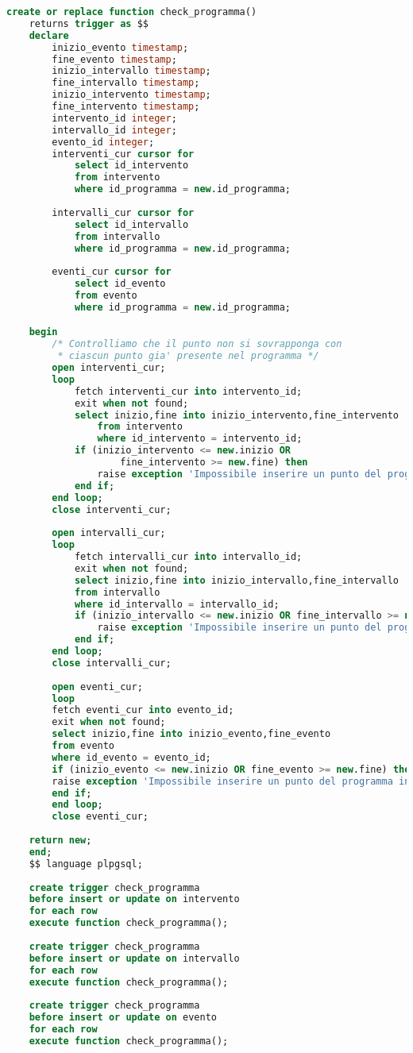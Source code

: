 \begin{lstlisting}[language=SQL,style=mystyle,caption={check\_programma\_entry}]
	create or replace function check_programma() 
	returns trigger as $$
	declare
		inizio_evento timestamp;
		fine_evento timestamp;
		inizio_intervallo timestamp;
		fine_intervallo timestamp;
		inizio_intervento timestamp;
		fine_intervento timestamp;
		intervento_id integer;
		intervallo_id integer;
		evento_id integer;
		interventi_cur cursor for 
			select id_intervento 
			from intervento 
			where id_programma = new.id_programma;
			
		intervalli_cur cursor for 
			select id_intervallo 
			from intervallo 
			where id_programma = new.id_programma;
			
		eventi_cur cursor for 
			select id_evento 
			from evento 
			where id_programma = new.id_programma;

	begin
		/* Controlliamo che il punto non si sovrapponga con
		 * ciascun punto gia' presente nel programma */
		open interventi_cur;
		loop 
			fetch interventi_cur into intervento_id;
			exit when not found;
			select inizio,fine into inizio_intervento,fine_intervento
				from intervento
				where id_intervento = intervento_id;
			if (inizio_intervento <= new.inizio OR 
					fine_intervento >= new.fine) then
				raise exception 'Impossibile inserire un punto del programma in questo orario';
			end if;
		end loop;
		close interventi_cur;
		
		open intervalli_cur;
		loop 
			fetch intervalli_cur into intervallo_id;
			exit when not found;
			select inizio,fine into inizio_intervallo,fine_intervallo
			from intervallo
			where id_intervallo = intervallo_id;
			if (inizio_intervallo <= new.inizio OR fine_intervallo >= new.fine) then
				raise exception 'Impossibile inserire un punto del programma in questo orario';
			end if;
		end loop;
		close intervalli_cur;
		
		open eventi_cur;
		loop 
		fetch eventi_cur into evento_id;
		exit when not found;
		select inizio,fine into inizio_evento,fine_evento
		from evento
		where id_evento = evento_id;
		if (inizio_evento <= new.inizio OR fine_evento >= new.fine) then
		raise exception 'Impossibile inserire un punto del programma in questo orario';
		end if;
		end loop;
		close eventi_cur;
		
	return new;
	end;
	$$ language plpgsql;
	
	create trigger check_programma
	before insert or update on intervento
	for each row
	execute function check_programma();
	
	create trigger check_programma
	before insert or update on intervallo
	for each row
	execute function check_programma();
	
	create trigger check_programma
	before insert or update on evento
	for each row
	execute function check_programma();
\end{lstlisting}

